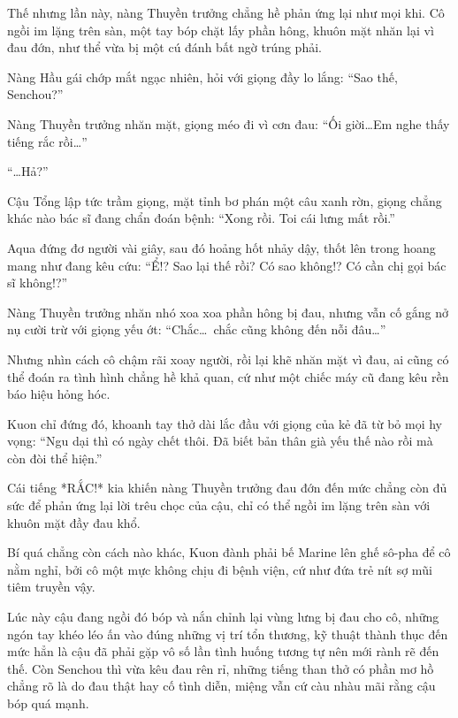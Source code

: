 \documentclass[../main.tex]{subfiles}
\begin{document}
Thế nhưng lần này, nàng Thuyền trưởng chẳng hề phản ứng lại như mọi khi. Cô ngồi im lặng trên sàn, một tay bóp chặt lấy phần hông, khuôn mặt nhăn lại vì đau đớn, như thể vừa bị một cú đánh bất ngờ trúng phải.

Nàng Hầu gái chớp mắt ngạc nhiên, hỏi với giọng đầy lo lắng: ``Sao thế, Senchou?''

Nàng Thuyền trưởng nhăn mặt, giọng méo đi vì cơn đau: ``Ối giời\dots Em nghe thấy tiếng rắc rồi\dots''

``\dots Hả?''

Cậu Tổng lập tức trầm giọng, mặt tỉnh bơ phán một câu xanh rờn, giọng chẳng khác nào bác sĩ đang chẩn đoán bệnh: ``Xong rồi. Toi cái lưng mất rồi.''

Aqua đứng đơ người vài giây, sau đó hoảng hốt nhảy dậy, thốt lên trong hoang mang như đang kêu cứu: ``Ể!? Sao lại thế rồi? Có sao không!? Có cần chị gọi bác sĩ không!?''

Nàng Thuyền trưởng nhăn nhó xoa xoa phần hông bị đau, nhưng vẫn cố gắng nở nụ cười trừ với giọng yếu ớt: ``Chắc\dots\ chắc cũng không đến nỗi đâu\dots''

Nhưng nhìn cách cô chậm rãi xoay người, rồi lại khẽ nhăn mặt vì đau, ai cũng có thể đoán ra tình hình chẳng hề khả quan, cứ như một chiếc máy cũ đang kêu rền báo hiệu hỏng hóc.

Kuon chỉ đứng đó, khoanh tay thở dài lắc đầu với giọng của kẻ đã từ bỏ mọi hy vọng: ``Ngu dại thì có ngày chết thôi. Đã biết bản thân già yếu thế nào rồi mà còn đòi thể hiện.''

Cái tiếng *RẮC!* kia khiến nàng Thuyền trưởng đau đớn đến mức chẳng còn đủ sức để phản ứng lại lời trêu chọc của cậu, chỉ có thể ngồi im lặng trên sàn với khuôn mặt đầy đau khổ.

\omk

Bí quá chẳng còn cách nào khác, Kuon đành phải bế Marine lên ghế sô-pha để cô nằm nghỉ, bởi cô một mực không chịu đi bệnh viện, cứ như đứa trẻ nít sợ mũi tiêm truyền vậy.

Lúc này cậu đang ngồi đó bóp và nắn chỉnh lại vùng lưng bị đau cho cô, những ngón tay khéo léo ấn vào đúng những vị trí tổn thương, kỹ thuật thành thục đến mức hẳn là cậu đã phải gặp vô số lần tình huống tương tự nên mới rành rẽ đến thế. Còn Senchou thì vừa kêu đau rên rỉ, những tiếng than thở có phần mơ hồ chẳng rõ là do đau thật hay cố tình diễn, miệng vẫn cứ càu nhàu mãi rằng cậu bóp quá mạnh.
\end{document}

